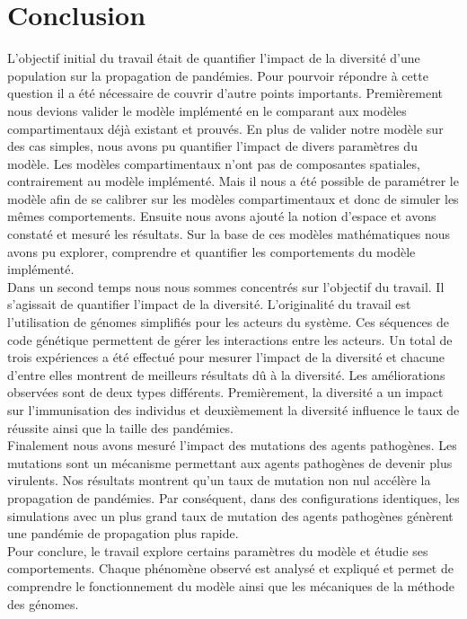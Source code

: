 \chapter{Conclusion} \label{ch:conclusion}

L'objectif initial du travail était de quantifier l'impact de la diversité d'une population sur la propagation de pandémies. Pour pourvoir répondre à cette question il a été nécessaire de couvrir d'autre points importants. Premièrement nous devions valider le modèle implémenté en le comparant aux modèles compartimentaux déjà existant et prouvés. En plus de valider notre modèle sur des cas simples, nous avons pu quantifier l'impact de divers paramètres du modèle. Les modèles compartimentaux n'ont pas de composantes spatiales, contrairement au modèle implémenté. Mais il nous a été possible de paramétrer le modèle afin de se calibrer sur les modèles compartimentaux et donc de simuler les mêmes comportements. Ensuite nous avons ajouté la notion d'espace et avons constaté et mesuré les résultats. Sur la base de ces modèles mathématiques nous avons pu explorer, comprendre et quantifier les comportements du modèle implémenté.\\

Dans un second temps nous nous sommes concentrés sur l'objectif du travail. Il s'agissait de quantifier l'impact de la diversité. L'originalité du travail est l'utilisation de génomes simplifiés pour les acteurs du système. Ces séquences de code génétique permettent de gérer les interactions entre les acteurs. Un total de trois expériences a été effectué pour mesurer l'impact de la diversité et chacune d'entre elles montrent de meilleurs résultats dû à la diversité. Les améliorations observées sont de deux types différents. Premièrement, la diversité a un impact sur l'immunisation des individus et deuxièmement la diversité influence le taux de réussite ainsi que la taille des pandémies.\\

Finalement nous avons mesuré l'impact des mutations des agents pathogènes. Les mutations sont un mécanisme permettant aux agents pathogènes de devenir plus virulents. Nos résultats montrent qu'un taux de mutation non nul accélère la propagation de pandémies. Par conséquent, dans des configurations identiques, les simulations avec un plus grand taux de mutation des agents pathogènes génèrent une pandémie de propagation plus rapide.\\

Pour conclure, le travail explore certains paramètres du modèle et étudie ses comportements. Chaque phénomène observé est analysé et expliqué et permet de comprendre le fonctionnement du modèle ainsi que les mécaniques de la méthode des génomes. 
